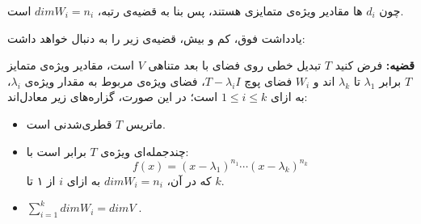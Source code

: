 چون $d_i$ ها مقادیر ویژه‌ی متمایزی هستند، پس بنا به قضیه‌ی رتبه، $dimW_i=n_i$ است.

یادداشت فوق، کم و بیش، قضیه‌ی زیر را به دنبال خواهد داشت:

\textbf{قضیه: }
فرض کنید $T$ تبدیل خطی روی فضای با بعد متناهی $V$ است، مقادیر ویژه‌ی متمایز $T$ برابر $\lambda_1$ تا $\lambda_k$ اند و $W_i$ فضای پوچ $T-\lambda_iI$، فضای ویژه‌ی مربوط به مقدار ویژه‌ی $\lambda_i$، به ازای $1\leq i \leq k$ است؛ در این صورت، گزاره‌های زیر معادل‌اند:

\begin{itemize}
	\item
	ماتریس $T$ قطری‌شدنی است.
	\item
	چندجمله‌ای ویژه‌ی $T$ برابر است با:
	$$f(x)=(x-\lambda_1)^{n_1} \cdots (x-\lambda_k)^{n_k} $$
	که در آن،
	$dim W_i = n_i$
	به ازای $i$ از ۱ تا $k$.
	\item 
	$\sum_{i=1}^k dimW_i = dimV \; .$
	
\end{itemize}








